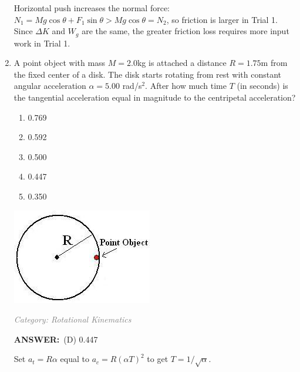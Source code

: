 ﻿\documentclass[12pt, a4paper]{article}
\makeatletter
\newcommand{\finalanswer}[1]{\textbf{ANSWER:}~#1}
\newif\if@categoryprinted
\newcommand{\category}[1]{\if@categoryprinted\relax\else\textit{\textcolor{gray}{Category: #1}}\global\@categoryprintedtrue\fi}
\newcommand{\tags}[1]{}
\makeatother
\begin{document}
\begin{CJK*}{UTF8}{gbsn}
\begin{enumerate}[itemsep=1.0em, topsep=0.6em]
\begin{solutionbox}
Horizontal push increases the normal force: $N_1=Mg\cos\theta+F_1\sin\theta>Mg\cos\theta=N_2$, so friction is larger in Trial 1. Since $\Delta K$ and $W_g$ are the same, the greater friction loss requires more input work in Trial 1.
\end{solutionbox}

\newpage

\item \label{prob:15}
\noindent\begin{minipage}[t]{0.6\linewidth}
\vspace{0pt}
A point object with mass $M=2.0$kg is attached a distance $R=1.75$m from the fixed center of a disk. The disk starts rotating from rest with constant angular acceleration $\alpha = 5.00$ rad/s$^2$. After how much time $T$ (in seconds) is the tangential acceleration equal in magnitude to the centripetal acceleration?
\begin{enumerate}[label=(\Alph*)]
    \item 0.769
    \item 0.592
    \item 0.500
    \item 0.447
    \item 0.350
\end{enumerate}
\end{minipage}%
\hfill
\begin{minipage}[t]{0.35\linewidth}
\vspace{0pt}
\centering
\includegraphics[width=\linewidth]{Problem_15_Figure.png}
\end{minipage}

\category{Rotational Kinematics} \tags{}
\begin{answerbox}
\finalanswer{(D) 0.447}
\end{answerbox}
\begin{insightbox}
Set $a_t=R\alpha$ equal to $a_c=R(\alpha T)^2$ to get $T=1/\sqrt{\alpha}$.
\end{insightbox}
\begin{solutionbox}


\end{solutionbox}
\end{enumerate}
\end{CJK*}
\end{document}
